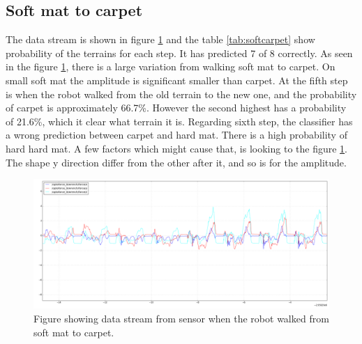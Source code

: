 \documentclass[USenglish]{ifimaster}  %
\begin{document}
\subsection{Soft mat to carpet}
The data stream is shown in figure \ref{fig:softcarpet} and the table \ref{tab:softcarpet} show probability of the terrains for each step. It has predicted 7 of 8 correctly. As seen in the figure \ref{fig:softcarpet}, there is a large variation from walking soft mat to carpet. On small soft mat the amplitude is significant smaller than carpet. At the fifth step is when the robot walked from the old terrain to the new one, and the probability of carpet is approximately 66.7\%. However the second highest has a probability of 21.6\%, which it clear what terrain it is. Regarding sixth step, the classifier has a wrong prediction between carpet and hard mat. There is a high probability of hard hard mat. A few factors which might cause that, is looking to the figure \ref{fig:softcarpet}. The shape y direction differ from the other after it, and so is for the amplitude.



\begin{figure}[h]
    \centering
    \includegraphics[width=\textwidth,height=\textheight,keepaspectratio]{Figures/MM4Teppe2}
    \caption{Figure showing data stream from sensor when the robot walked from soft mat to carpet.}
    \label{fig:softcarpet}
\end{figure}
\end{document}

